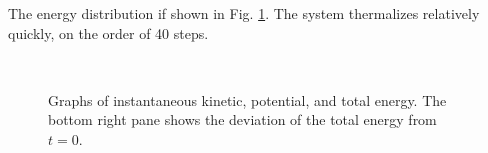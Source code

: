 \documentclass[singlepage,notitlepage,nofootinbib,11pt]{revtex4-1}
\begin{document}
The energy distribution if shown in Fig. \ref{fig10}. The system thermalizes relatively quickly, on the order of 40 steps.
\begin{figure}[h]
  \captionsetup[subfigure]{labelformat=empty}
  \centering
  \\
  \hfill
  \caption{\label{fig10} Graphs of instantaneous kinetic, potential, and total energy. The bottom right pane shows the deviation of the total energy from $t=0$.}
\end{figure}
\end{document}
